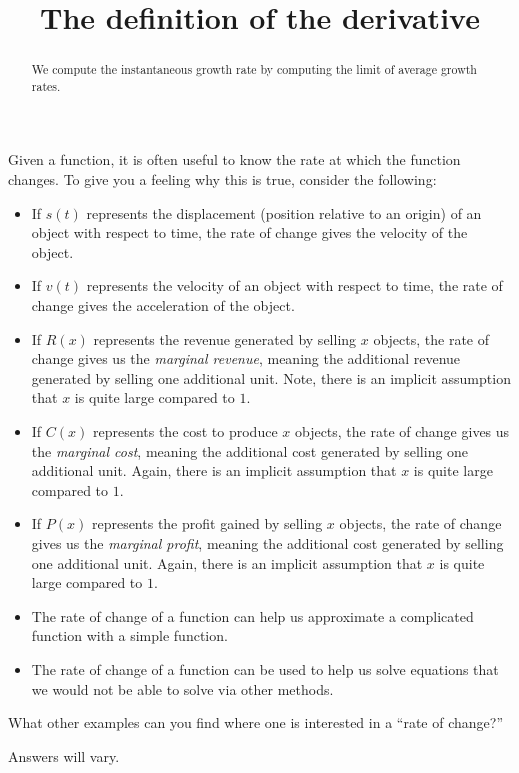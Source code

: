 \documentclass{ximera}
\title[Dig-In:]{The definition of the derivative}
\begin{document}
\begin{abstract}
We compute the instantaneous growth rate by computing the limit of
average growth rates.
\end{abstract}
\maketitle


Given a function, it is often useful to know the rate at which the
function changes. To give you a feeling why this is true, consider the
following:
\begin{itemize}
\item If $s(t)$ represents the displacement (position relative to an
  origin) of an object with respect to time, the rate of change gives
  the velocity of the object.
\item If $v(t)$ represents the velocity of an object with respect to
  time, the rate of change gives the acceleration of the object.
\item If $R(x)$ represents the revenue generated by selling $x$
  objects, the rate of change gives us the \textit{marginal revenue},
  meaning the additional revenue generated by selling one additional
  unit. Note, there is an implicit assumption that $x$ is quite large
  compared to $1$.
\item If $C(x)$ represents the cost to produce $x$ objects, the rate
  of change gives us the \textit{marginal cost}, meaning the
  additional cost generated by selling one additional unit. Again,
  there is an implicit assumption that $x$ is quite large compared to
  $1$.
\item If $P(x)$ represents the profit gained by selling $x$ objects,
  the rate of change gives us the \textit{marginal profit}, meaning
  the additional cost generated by selling one additional unit. Again,
  there is an implicit assumption that $x$ is quite large compared to
  $1$.
\item The rate of change of a function can help us approximate a
  complicated function with a simple function.
\item The rate of change of a function can be used to help us solve
  equations that we would not be able to solve via other methods.
\end{itemize}

\begin{xarmaBoost}
What other examples can you find where one is interested in a ``rate
of change?''
\begin{freeResponse}
Answers will vary.
\end{freeResponse}
\end{xarmaBoost}
\end{document}
